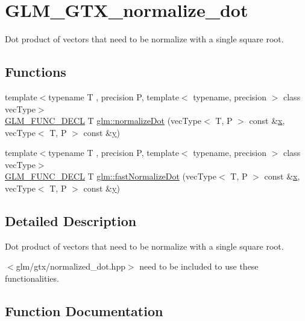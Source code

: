 \hypertarget{group__gtx__normalize__dot}{}\section{G\+L\+M\+\_\+\+G\+T\+X\+\_\+normalize\+\_\+dot}
\label{group__gtx__normalize__dot}


Dot product of vectors that need to be normalize with a single square root.  


\subsection*{Functions}
\begin{DoxyCompactItemize}
\item 
{\footnotesize template$<$typename T , precision P, template$<$ typename, precision $>$ class vec\+Type$>$ }\\\mbox{\hyperlink{setup_8hpp_ab2d052de21a70539923e9bcbf6e83a51}{G\+L\+M\+\_\+\+F\+U\+N\+C\+\_\+\+D\+E\+CL}} T \mbox{\hyperlink{group__gtx__normalize__dot_gaffbc2f2cb15838de8886a68048f9004d}{glm\+::normalize\+Dot}} (vec\+Type$<$ T, P $>$ const \&\mbox{\hyperlink{glad_8h_a92d0386e5c19fb81ea88c9f99644ab1d}{x}}, vec\+Type$<$ T, P $>$ const \&\mbox{\hyperlink{glad_8h_a66ddd433d2cacfe27f5906b7e86faeed}{y}})
\item 
{\footnotesize template$<$typename T , precision P, template$<$ typename, precision $>$ class vec\+Type$>$ }\\\mbox{\hyperlink{setup_8hpp_ab2d052de21a70539923e9bcbf6e83a51}{G\+L\+M\+\_\+\+F\+U\+N\+C\+\_\+\+D\+E\+CL}} T \mbox{\hyperlink{group__gtx__normalize__dot_ga8593b21bc2fe22184f01d5e08b5a2024}{glm\+::fast\+Normalize\+Dot}} (vec\+Type$<$ T, P $>$ const \&\mbox{\hyperlink{glad_8h_a92d0386e5c19fb81ea88c9f99644ab1d}{x}}, vec\+Type$<$ T, P $>$ const \&\mbox{\hyperlink{glad_8h_a66ddd433d2cacfe27f5906b7e86faeed}{y}})
\end{DoxyCompactItemize}


\subsection{Detailed Description}
Dot product of vectors that need to be normalize with a single square root. 

$<$glm/gtx/normalized\+\_\+dot.\+hpp$>$ need to be included to use these functionalities. 

\subsection{Function Documentation}
\mbox{\label{group__gtx__normalize__dot_ga8593b21bc2fe22184f01d5e08b5a2024}} 
